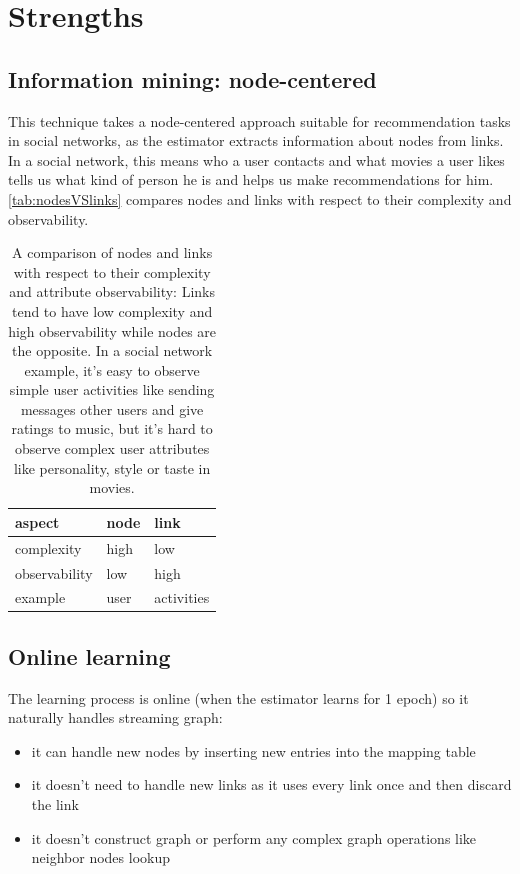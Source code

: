 \documentclass{article}
\begin{document}
\section{Strengths}

\subsection{Information mining: node-centered}
This technique takes a node-centered approach suitable for recommendation tasks 
in social networks, as the estimator extracts information about nodes from 
links.
In a social network, this means who a user contacts and what 
movies a user likes tells us what kind of person he is and helps us make 
recommendations for him. 
\autoref{tab:nodesVSlinks} compares nodes and links with respect to their 
complexity and observability.
\begin{table}[h]
	\centering
	\begin{tabularx}{0.5\textwidth}{ |X|X|X| } \hline
		aspect  & node & link \\ \hline
		complexity & high & low \\ \hline
		observability & low & high \\ \hline
		example & user & activities \\ \hline
	\end{tabularx}
	\caption{A comparison of nodes and links with respect to their complexity 
		and attribute observability:
		Links tend to have low complexity and high observability while nodes 
		are the opposite.
		In a social network example,
		it's easy to observe simple user activities like sending messages other 
		users and give ratings to music,
		but it's hard to observe complex user attributes like personality, 
		style or taste in movies.}
	\label{tab:nodesVSlinks}
\end{table}

\subsection{Online learning}
The learning process is online (when the estimator learns for 1 epoch) so it 
naturally handles streaming graph:
\begin{itemize}
	\item it can handle new nodes by inserting new entries into the mapping 
	table
	\item it doesn't need to handle new links as it uses every link once and 
	then discard the link
	\item it doesn't construct graph or perform any complex graph operations 
	like neighbor nodes lookup
\end{itemize}
\end{document}
